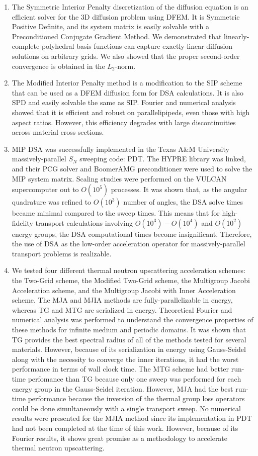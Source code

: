 \begin{enumerate}
\item The Symmetric Interior Penalty discretization of the diffusion equation is an efficient solver for the 3D diffusion problem using DFEM. It is Symmetric Positive Definite, and its system matrix is easily solvable with a Preconditioned Conjugate Gradient Method. We demonstrated that linearly-complete polyhedral basis functions can capture exactly-linear diffusion solutions on arbitrary grids. We also showed that the proper second-order convergence is obtained in the $L_2$-norm.
\item The Modified Interior Penalty method is a modification to the SIP scheme that can be used as a DFEM diffusion form for DSA calculations. It is also SPD and easily solvable the same as SIP. Fourier and numerical analysis showed that it is efficient and robust on parallelipipeds, even those with high aspect ratios. However, this efficiency degrades with large discontinuities across material cross sections.
\item MIP DSA was successfully implemented in the Texas A\&M University massively-parallel $S_N$ sweeping code: PDT. The HYPRE library was linked, and their PCG solver and BoomerAMG preconditioner were used to solve the MIP system matrix. Scaling studies were performed on the VULCAN supercomputer out to $O(10^5)$ processes. It was shown that, as the angular quadrature was refined to $O(10^3)$ number of angles, the DSA solve times became minimal compared to the sweep times. This means that for high-fidelity transport calculations involving $O(10^3) - O(10^4)$ and $O(10^2)$ energy groups, the DSA computational times become insignificant. Therefore, the use of DSA as the low-order acceleration operator for massively-parallel transport problems is realizable.
\item We tested four different thermal neutron upscattering acceleration schemes: the Two-Grid scheme, the Modified Two-Grid scheme, the Multigroup Jacobi Acceleration scheme, and the Multigroup Jacobi with Inner Acceleration scheme. The MJA and MJIA methods are fully-parallelizable in energy, whereas TG and MTG are serialized in energy. Theoretical Fourier and numerical analysis was performed to understand the convergence properties of these methods for infinite medium and periodic domains. It was shown that TG provides the best spectral radius of all of the methods tested for several materials. However, because of its serialization in energy using Gauss-Seidel along with the necessity to converge the inner iterations, it had the worst performance in terms of wall clock time. The MTG scheme had better run-time perfomance than TG because only one sweep was performed for each energy group in the Gauss-Seidel iteration. However, MJA had the best run-time performance because the inversion of the thermal group loss operators could be done simultaneously with a single transport sweep. No numerical results were presented for the MJIA method since its implementation in PDT had not been completed at the time of this work. However, because of its Fourier results, it shows great promise as a methodology to accelerate thermal neutron upscattering.
\end{enumerate}

